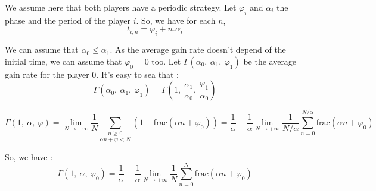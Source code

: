 We assume here that both players have a periodic strategy. Let $ \varphi_i $ and 
$ \alpha_i $ the phase and the period of the player $i$. So, we have for each $n$,
\[ t_{i,n} = \varphi_i + n.\alpha_i \]

We can assume that $\alpha_0 \leq \alpha_1 $. 
As the average gain rate doesn't depend of the initial time, we can assume that $ \varphi_0 = 0 $ too.
Let $ \Gamma\left(\alpha_0,\:\alpha_1,\:\varphi_1\right) $ be the average gain rate for the player $ 0 $.
It's easy to sea that :
\[ \Gamma\left(\alpha_0,\:\alpha_1,\:\varphi_1\right) =
\Gamma\left(1,\:\frac{\alpha_1}{\alpha_0},\:\frac{\varphi_1}{\alpha_0}\right) \]

\begin{center}\begin{figure}[h!, scale=.8]\centering{}\end{figure}\end{center}

\[
\Gamma\left(1,\:\alpha,\:\varphi\right)=
\lim_{N\rightarrow+\infty}\frac{1}{N} \underset{\alpha n+\varphi<N}{\underset{n\geq0}{\sum}}
\left(1-\mathrm{frac}\left(\alpha n+\varphi_{0}\right)\right)
=\frac{1}{\alpha} - \frac{1}{\alpha}\lim_{N\rightarrow+\infty}\frac{1}{N/\alpha}
\underset{n=0}{\overset{N/\alpha}{\sum}}\mathrm{frac}\left(\alpha n+\varphi_{0}\right)\]

So, we have :\[
\Gamma\left(1,\:\alpha,\:\varphi_{0}\right)=\frac{1}{\alpha} - \frac{1}{\alpha}\lim_{N\rightarrow+\infty}\frac{1}{N}
\underset{n=0}{\overset{N}{\sum}}\mathrm{frac}\left(\alpha n+\varphi_{0}\right)\]

